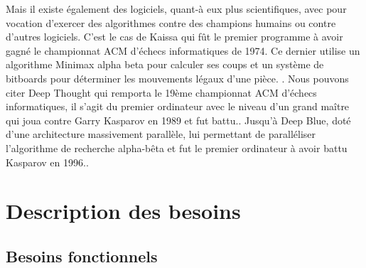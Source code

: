 \huge\documentclass{article}
\begin{document}
    Mais il existe également des logiciels, quant-à eux plus scientifiques, avec pour vocation d'exercer des algorithmes contre des champions humains ou contre d'autres logiciels.
    \newline
    C'est le cas de Kaissa qui fût le premier programme à avoir gagné le championnat ACM d'échecs informatiques de 1974. Ce dernier utilise un algorithme Minimax alpha beta \cite{KaissaAB} pour calculer ses coups et un système de bitboards pour déterminer les mouvements légaux d'une pièce. \cite{Kaissa}\cite{KaissaBitboard}\cite{RotatedBitBoards}.
    \newline
    Nous pouvons citer Deep Thought qui remporta le 19ème championnat ACM d'échecs informatiques, il s'agit du premier ordinateur avec le niveau d'un grand maître qui joua contre Garry Kasparov en 1989 et fut battu.\cite{Deep}.
    \newline
    Jusqu'à Deep Blue, doté d'une architecture massivement parallèle, lui permettant de paralléliser l'algorithme de recherche alpha-bêta\cite{DeepSystem} et fut le premier ordinateur à avoir battu Kasparov en 1996.\cite{Deep}.

    \section{Description des besoins}

    \subsection{Besoins fonctionnels}
    \medskip
\end{document}
